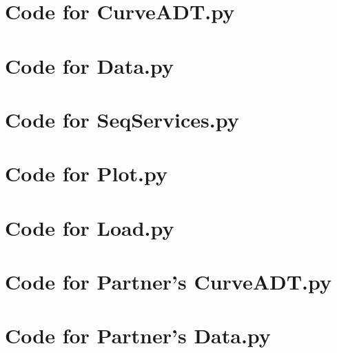 \documentclass[12pt]{article}
\begin{document}
\newpage

\lstset{language=Python, basicstyle=\tiny, breaklines=true, showspaces=false,
  showstringspaces=false, breakatwhitespace=true}

\def\thesection{\Alph{section}}

\section{Code for CurveADT.py}

\noindent 

\newpage

\section{Code for Data.py}

\noindent 

\newpage

\section{Code for SeqServices.py}

\noindent 

\newpage

\section{Code for Plot.py}

\noindent 

\newpage

\section{Code for Load.py}

\noindent 

\newpage

\section{Code for Partner's CurveADT.py}

\noindent 

\newpage

\section{Code for Partner's Data.py}
\end{document}
